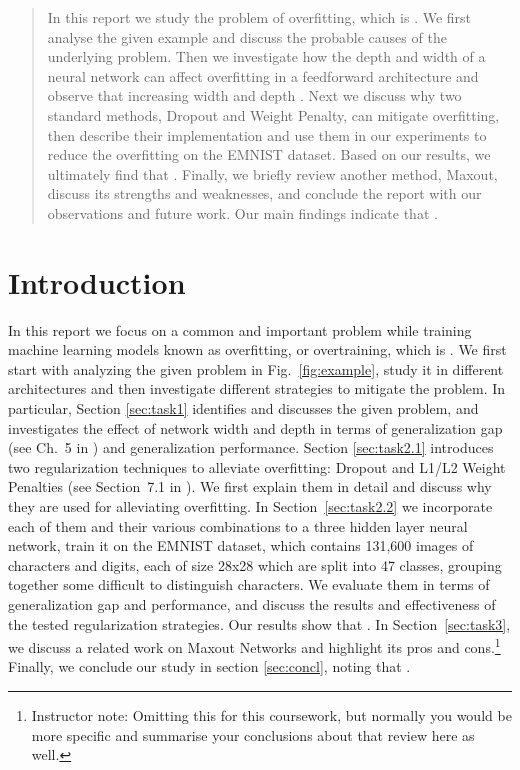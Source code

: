 \documentclass{article}
\begin{document}

\begin{abstract}
    In this report we study the problem of overfitting, which is \questionOne.
    We first analyse the given example and discuss the probable causes of the underlying problem.
    Then we investigate how the depth and width of a neural network
    can affect overfitting in a feedforward architecture and observe that increasing width and depth \questionTwo.
    Next we discuss why two standard methods, Dropout and Weight Penalty, can
    mitigate overfitting, then describe their implementation and use them in our experiments
    to reduce the overfitting on the EMNIST dataset.
    Based on our results, we ultimately find that \questionThree.
    Finally, we briefly review another method, Maxout, discuss its strengths and weaknesses, and conclude the report with our observations and future work. Our main findings indicate that \questionFour.
\end{abstract}

\section{Introduction}
\label{sec:intro}
In this report we focus on a common and important problem while training machine learning models known as overfitting, or overtraining, which is \questionOne.
We first start with analyzing the given problem in Fig.~\ref{fig:example}, study it in different architectures and then investigate different strategies to mitigate the problem.
In particular, Section \ref{sec:task1} identifies and discusses the given problem, and investigates the effect of network width and depth in terms of generalization gap (see Ch.~5 in \citealt{Goodfellow-et-al-2016}) and generalization performance.
Section \ref{sec:task2.1} introduces two regularization techniques to alleviate overfitting: Dropout \cite{srivastava2014dropout} and L1/L2 Weight Penalties (see Section~7.1 in \citealt{Goodfellow-et-al-2016}).
We first explain them in detail and discuss why they are used for alleviating overfitting.
In Section~\ref{sec:task2.2} we incorporate each of them and their various combinations to a three hidden layer neural network, train it on the EMNIST dataset, which contains 131,600 images of characters and digits, each of size 28x28 which are split into 47 classes, grouping together some difficult to distinguish characters.
We evaluate them in terms of generalization gap and performance, and discuss the results and effectiveness of the tested regularization strategies.
Our results show that \questionThree.
In Section~\ref{sec:task3}, we discuss a related work on Maxout Networks and highlight its pros and cons.\footnote{Instructor note: Omitting this for this coursework, but normally you would be more specific and summarise your conclusions about that review here as well.}
Finally, we conclude our study in section \ref{sec:concl}, noting that \questionFour.
\end{document}
